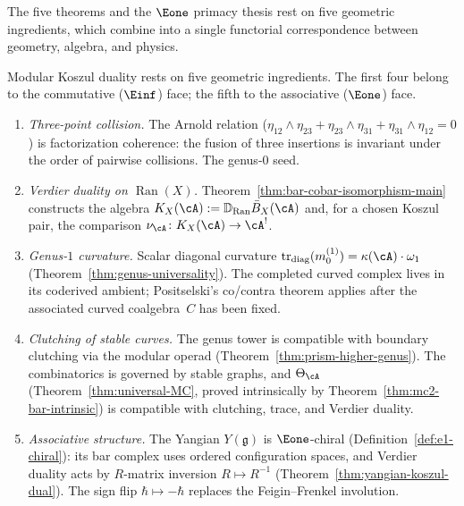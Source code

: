 The five theorems and the $\Eone$ primacy thesis rest on five
geometric ingredients, which combine into a single functorial
correspondence between geometry, algebra, and physics.

\begin{remark}\label{rem:five-pieces}
Modular Koszul duality rests on five geometric ingredients.
The first four belong to the commutative ($\Einf$) face; the fifth
to the associative ($\Eone$) face.
\begin{enumerate}[label=\textup{(\roman*)}]
\item \emph{Three-point collision.}
 The Arnold relation
 ($\eta_{12}\wedge\eta_{23}+\eta_{23}\wedge\eta_{31}+\eta_{31}\wedge\eta_{12}=0$)
 is factorization
 coherence: the fusion of three insertions is invariant under the
 order of pairwise collisions. The genus-$0$ seed.
\item \emph{Verdier duality on $\operatorname{Ran}(X)$.}
 Theorem~\ref{thm:bar-cobar-isomorphism-main} constructs the algebra
 $K_X(\cA):=\mathbb{D}_{\operatorname{Ran}}\bar{B}_X(\cA)$ and, for a
 chosen Koszul pair, the comparison
 $\nu_\cA\colon K_X(\cA)\to\cA^!$.
\item \emph{Genus-$1$ curvature.}
 Scalar diagonal curvature
 $\operatorname{tr}_{\mathrm{diag}}(m_0^{(1)})
 = \kappa(\cA) \cdot \omega_1$
 (Theorem~\ref{thm:genus-universality}). The completed curved complex
 lives in its coderived ambient; Positselski's co/contra theorem applies
 after the associated curved coalgebra~$C$ has been fixed.
\item \emph{Clutching of stable curves.}
 The genus tower is compatible with boundary clutching via the
 modular operad (Theorem~\ref{thm:prism-higher-genus}).
 The combinatorics is governed by stable graphs, and
 $\Theta_\cA$ (Theorem~\ref{thm:universal-MC},
 proved intrinsically by Theorem~\ref{thm:mc2-bar-intrinsic})
 is compatible with clutching, trace, and Verdier duality.
\item \emph{Associative structure.}
 The Yangian $Y(\mathfrak{g})$ is $\Eone$-chiral
 (Definition~\ref{def:e1-chiral}): its bar complex uses ordered
 configuration spaces, and Verdier duality acts by $R$-matrix
 inversion $R \mapsto R^{-1}$
 (Theorem~\ref{thm:yangian-koszul-dual}).
 The sign flip $\hbar \mapsto -\hbar$ replaces the Feigin--Frenkel
 involution.
\end{enumerate}


\end{remark}

